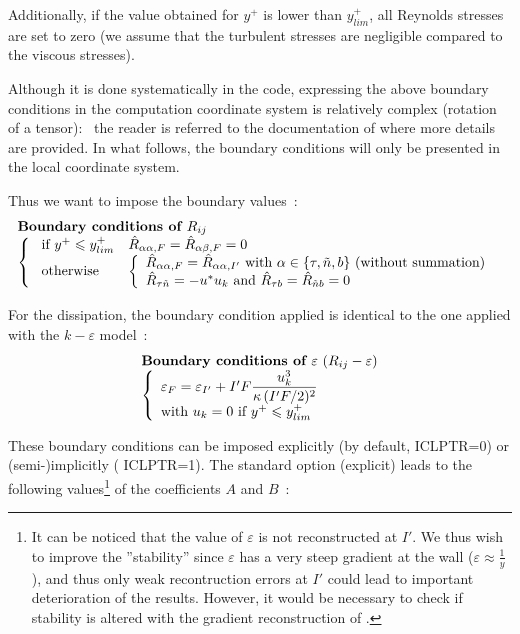 Additionally, if the value obtained for $y^+$ is lower
than  $y^+_{lim}$, all Reynolds stresses are set to zero
(we assume that the turbulent stresses are negligible
compared to the viscous stresses).

Although it is done systematically in the code,
expressing the above boundary conditions in the computation coordinate
system is relatively complex (rotation of a tensor):~
the reader is referred to the documentation of 
where more details are provided. In what follows,
the boundary conditions will only be presented in the local
coordinate system.

Thus we want to impose the boundary values~:
\begin{equation}
\begin{array}{l}
\text{\bf Boundary conditions of } R_{ij} \\
\left\{\begin{array}{lll}
\text{ if }y^+\leqslant y^+_{lim}&\hat R_{\alpha\alpha,F} = \hat R_{\alpha\beta,F} = 0 \\
\text { otherwise }                         &\left\{\begin{array}{l}
\hat R_{\alpha\alpha,F} = \hat R_{\alpha\alpha,I'}  \text{ with }\alpha \in \{\tau,\tilde{n},b\}\text{ (without summation)}\\
\hat R_{\tau\tilde{n}} = -u^*u_k  \text { and } \hat R_{\tau b} = \hat
R_{\tilde{n} b} =0
\end{array}\right.
\end{array}\right.
\end{array}
\end{equation}

For the dissipation, the boundary condition applied is identical to the
one applied with the $k-\varepsilon$ model~:
\begin{equation}
\begin{array}{l}
\text{\bf Boundary conditions of } \varepsilon  \text{ }(R_{ij}-\varepsilon)  \\
\left\{
\begin{array}{l}
\varepsilon_F=\varepsilon_{I'}+I'F\displaystyle\frac{ u_k^3}{\kappa\, (I'F/2)^2}\\
\text{with } u_k = 0 \text { if } y^+\leqslant y^+_{lim}
\end{array}\right.
\end{array}
\end{equation}


These boundary conditions can be imposed explicitly (by default,  ICLPTR=0)
or (semi-)implicitly ( ICLPTR=1). The standard option (explicit) leads to
the following values\footnote{It can be noticed
that the value of $\varepsilon$ is not reconstructed at $I'$. We thus wish
to improve the ''stability'' since $\varepsilon$ has a very steep gradient
at the wall ($\varepsilon \approx \displaystyle\frac{1}{y}$), and thus
only weak recontruction errors at $I'$ could lead to important
deterioration of the results. However, it would be necessary to
check if stability is altered with the gradient reconstruction of
.}
of the coefficients  $A$ and $B$~:


